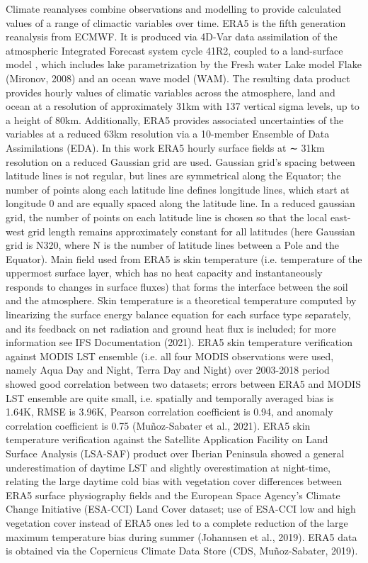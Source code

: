 \documentclass[hess, manuscript]{copernicus}
\begin{document}
Climate reanalyses combine observations and modelling to provide calculated values of a range of climactic variables over time. ERA5 is the fifth generation reanalysis from ECMWF. It is produced via 4D-Var data assimilation of the atmospheric Integrated Forecast system cycle 41R2, coupled to a land-surface model \citep[ECLand,][]{Boussetta2021}, which includes lake parametrization by the Fresh water Lake model Flake (Mironov, 2008) and an ocean wave model (WAM). The resulting data product provides hourly values of climatic variables across the atmosphere, land and ocean at a resolution of approximately 31km with 137 vertical sigma levels, up to a height of 80km. Additionally, ERA5 provides associated uncertainties of the variables at a reduced 63km resolution via a 10-member Ensemble of Data Assimilations (EDA). In this work ERA5 hourly surface fields at ∼ 31km resolution on a reduced Gaussian grid are used. Gaussian grid’s spacing between latitude lines is not regular, but lines are symmetrical along the Equator; the number of points along each latitude line defines longitude lines, which start at longitude 0 and are equally spaced along the latitude line. In a reduced gaussian grid, the number of points on each latitude line is chosen so that the local east-west grid length remains approximately constant for all latitudes (here Gaussian grid is N320, where N is the number of latitude lines between a Pole and the Equator). Main field used from ERA5 is skin temperature (i.e. temperature of the uppermost surface layer, which has no heat capacity and instantaneously responds to changes in surface fluxes) that forms the interface between the soil and the atmosphere. Skin temperature is a theoretical temperature computed by linearizing the surface energy balance equation for each surface type separately, and its feedback on net radiation and ground heat flux is included; for more information see IFS Documentation (2021). ERA5 skin temperature verification against MODIS LST ensemble (i.e. all four MODIS observations were used, namely Aqua Day and Night, Terra Day and Night) over 2003-2018 period showed good correlation between two datasets; errors between ERA5 and MODIS LST ensemble are quite small, i.e. spatially and temporally averaged bias is 1.64K, RMSE is 3.96K, Pearson correlation coefficient is 0.94, and anomaly correlation coefficient is 0.75 (Muñoz-Sabater et al., 2021). ERA5 skin temperature verification against the Satellite Application Facility on Land Surface Analysis (LSA-SAF) product over Iberian Peninsula showed a general underestimation of daytime LST and slightly overestimation at night-time, relating the large daytime cold bias with vegetation cover differences between ERA5 surface physiography fields and the European Space Agency’s Climate Change Initiative (ESA-CCI) Land Cover dataset; use of ESA-CCI low and high vegetation cover instead of ERA5 ones led to a complete reduction of the large maximum temperature bias during summer (Johannsen et al., 2019). ERA5 data is obtained via the Copernicus Climate Data Store (CDS, Muñoz-Sabater, 2019).
\end{document}
